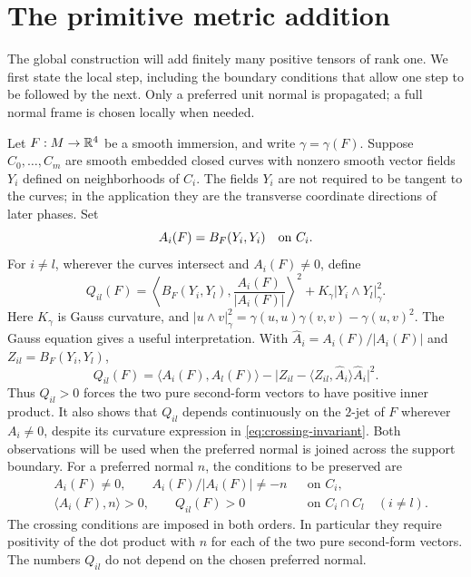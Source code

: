 \section{The primitive metric addition}
\label{sec:primitive-statement}

The global construction will add finitely many positive tensors of rank one.
We first state the local step, including the boundary conditions that allow
one step to be followed by the next.  Only a preferred unit normal is
propagated; a full normal frame is chosen locally when needed.

Let $F:M\to\mathbb{R}^4$ be a smooth immersion, and write $\gamma=\gamma(F)$.
Suppose $C_0,\ldots,C_m$ are smooth embedded closed curves with nonzero
smooth vector fields $Y_i$ defined on neighborhoods of $C_i$.
The fields $Y_i$ are not required to be tangent to the curves; in the
application they are the transverse coordinate directions of later phases.
Set
\[
 A_i(F)=B_F(Y_i,Y_i)\quad\hbox{on }C_i.
\]
For $i\ne l$, wherever the curves intersect and $A_i(F)\ne0$, define
\begin{equation}
 Q_{il}(F)=
 \left\langle B_F(Y_i,Y_l),\frac{A_i(F)}{|A_i(F)|}\right\rangle^2
 +K_{\gamma}|Y_i\wedge Y_l|_{\gamma}^2.
 \label{eq:crossing-invariant}
\end{equation}
Here $K_\gamma$ is Gauss curvature, and
$|u\wedge v|_\gamma^2=\gamma(u,u)\gamma(v,v)-\gamma(u,v)^2$.
The Gauss equation gives a useful interpretation.  With
$\widehat A_i=A_i(F)/|A_i(F)|$ and $Z_{il}=B_F(Y_i,Y_l)$,
\begin{equation}
 Q_{il}(F)=\langle A_i(F),A_l(F)\rangle
       -\bigl|Z_{il}-\langle Z_{il},\widehat A_i\rangle\widehat A_i\bigr|^2.
 \label{eq:crossing-gauss-interpretation}
\end{equation}
Thus $Q_{il}>0$ forces the two pure second-form vectors to have positive
inner product.  It also shows that $Q_{il}$ depends continuously on the
$2$-jet of $F$ wherever $A_i\ne0$, despite its curvature expression
in \eqref{eq:crossing-invariant}.  Both observations will be used when
the preferred normal is joined across the support boundary.
For a preferred normal $n$, the conditions to be preserved are
\begin{equation}
 \begin{aligned}
 &A_i(F)\ne0,\qquad A_i(F)/|A_i(F)|\ne-n
 &&\text{on }C_i,\\
 &\langle A_i(F),n\rangle>0,\qquad Q_{il}(F)>0
 &&\text{on }C_i\cap C_l\quad(i\ne l).
 \end{aligned}
 \label{eq:boundary-invariants}
\end{equation}
The crossing conditions are imposed in both orders.  In particular they
require positivity of the dot product with $n$ for each of the two pure
second-form vectors.  The numbers $Q_{il}$ do not depend on the chosen
preferred normal.

